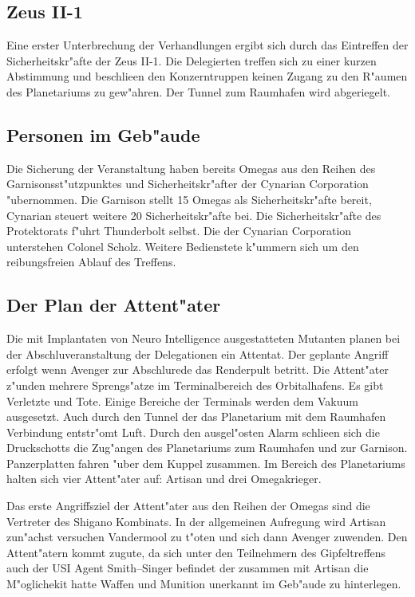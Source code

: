 \subsection{Zeus II-1} 
Eine erster Unterbrechung der Verhandlungen ergibt sich durch das Eintreffen der Sicherheitskr"afte der Zeus II-1. Die Delegierten treffen sich zu einer kurzen Abstimmung und beschlie\3en den Konzerntruppen keinen Zugang zu den R"aumen des Planetariums zu gew"ahren. Der Tunnel zum Raumhafen wird abgeriegelt. 

\subsection{Personen im Geb"aude} 
Die Sicherung der Veranstaltung haben bereits Omegas aus den Reihen des Garnisonsst"utzpunktes und Sicherheitskr"after der Cynarian Corporation "ubernommen. Die Garnison stellt 15 Omegas als Sicherheitskr"afte bereit, Cynarian steuert weitere 20 Sicherheitskr"afte bei. Die Sicherheitskr"afte des Protektorats f"uhrt Thunderbolt selbst. Die der Cynarian Corporation unterstehen Colonel Scholz. Weitere Bedienstete k"ummern sich um den reibungsfreien Ablauf des Treffens.

\subsection{Der Plan der Attent"ater} 
Die mit Implantaten von Neuro Intelligence ausgestatteten Mutanten planen bei der Abschlu\3veranstaltung der Delegationen ein Attentat. 
Der geplante Angriff erfolgt wenn Avenger zur Abschlu\3rede das Renderpult betritt. Die Attent"ater z"unden mehrere Sprengs"atze im Terminalbereich des Orbitalhafens. Es gibt Verletzte und Tote. Einige Bereiche der Terminals werden dem Vakuum ausgesetzt. Auch durch den  Tunnel der das Planetarium mit dem Raumhafen Verbindung entstr"omt Luft. Durch den ausgel"osten Alarm schlie\3en sich die Druckschotts die Zug"angen des Planetariums zum Raumhafen und zur Garnison. Panzerplatten fahren "uber dem Kuppel zusammen. Im Bereich des Planetariums halten sich vier Attent"ater auf: Artisan und drei Omegakrieger.

Das erste Angriffsziel der Attent"ater aus den Reihen der Omegas sind die Vertreter des Shigano Kombinats. In der allgemeinen Aufregung wird Artisan zun"achst versuchen Vandermool zu t"oten und sich dann Avenger zuwenden. Den Attent"atern kommt zugute, da\3 sich unter den Teilnehmern des Gipfeltreffens auch der USI Agent Smith--Singer befindet der zusammen mit Artisan die M"oglichekit hatte Waffen und Munition unerkannt im Geb"aude zu hinterlegen.


